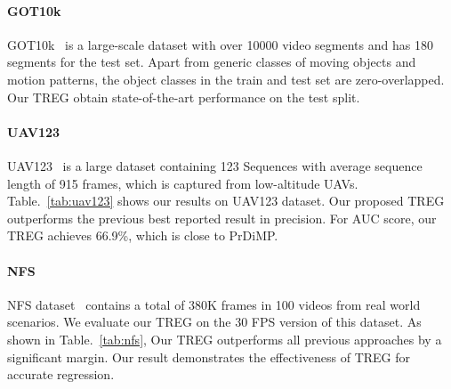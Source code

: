 \documentclass[10pt,twocolumn,letterpaper]{article}
\begin{document}
\begin{table}[t]
\begin{center}
\fontsize{7}{9}\selectfont 
{}
\end{center}
\vspace{-0.2cm}
\caption{Comparison with state-of-the-art trackers on NFS.} 
\label{tab:nfs}
\vspace{-0.3cm}
\end{table}

\paragraph{GOT10k}
GOT10k~\cite{got10k} is a large-scale dataset with over 10000 video segments and has 180 segments for the test set. Apart from generic classes of moving objects and motion patterns, the object classes in the train and test set are zero-overlapped. Our TREG obtain state-of-the-art performance on the test split.



\paragraph{UAV123}
UAV123~\cite{uav123} is a large dataset containing 123 Sequences with average sequence length of 915 frames, which is captured from low-altitude UAVs. Table.~\ref{tab:uav123} shows our results on UAV123 dataset.
Our proposed TREG outperforms the previous best reported result in precision. For AUC score, our TREG achieves 66.9\%, which is close to PrDiMP. 

\paragraph{NFS}
NFS dataset~\cite{nfs} contains a total of 380K frames in 100 videos from real world scenarios. We evaluate our TREG on the 30 FPS version of this dataset. As shown in Table.~\ref{tab:nfs}, Our TREG outperforms all previous approaches by a significant margin. Our result demonstrates the effectiveness of TREG for accurate regression.
\end{document}
